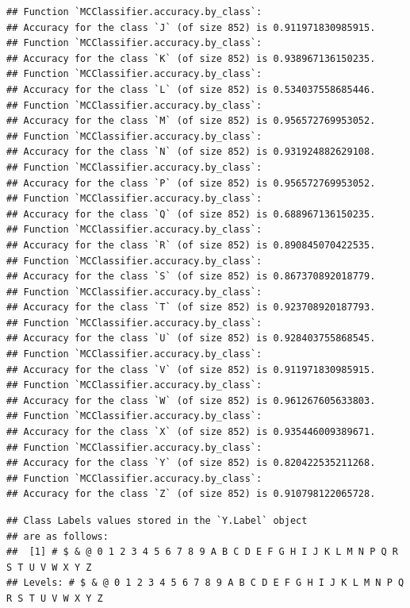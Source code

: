 \documentclass[
]{report}
\begin{document}
\begin{verbatim}
## Function `MCClassifier.accuracy.by_class`:
## Accuracy for the class `J` (of size 852) is 0.911971830985915.
## Function `MCClassifier.accuracy.by_class`:
## Accuracy for the class `K` (of size 852) is 0.938967136150235.
## Function `MCClassifier.accuracy.by_class`:
## Accuracy for the class `L` (of size 852) is 0.534037558685446.
## Function `MCClassifier.accuracy.by_class`:
## Accuracy for the class `M` (of size 852) is 0.956572769953052.
## Function `MCClassifier.accuracy.by_class`:
## Accuracy for the class `N` (of size 852) is 0.931924882629108.
## Function `MCClassifier.accuracy.by_class`:
## Accuracy for the class `P` (of size 852) is 0.956572769953052.
## Function `MCClassifier.accuracy.by_class`:
## Accuracy for the class `Q` (of size 852) is 0.688967136150235.
## Function `MCClassifier.accuracy.by_class`:
## Accuracy for the class `R` (of size 852) is 0.890845070422535.
## Function `MCClassifier.accuracy.by_class`:
## Accuracy for the class `S` (of size 852) is 0.867370892018779.
## Function `MCClassifier.accuracy.by_class`:
## Accuracy for the class `T` (of size 852) is 0.923708920187793.
## Function `MCClassifier.accuracy.by_class`:
## Accuracy for the class `U` (of size 852) is 0.928403755868545.
## Function `MCClassifier.accuracy.by_class`:
## Accuracy for the class `V` (of size 852) is 0.911971830985915.
## Function `MCClassifier.accuracy.by_class`:
## Accuracy for the class `W` (of size 852) is 0.961267605633803.
## Function `MCClassifier.accuracy.by_class`:
## Accuracy for the class `X` (of size 852) is 0.935446009389671.
## Function `MCClassifier.accuracy.by_class`:
## Accuracy for the class `Y` (of size 852) is 0.820422535211268.
## Function `MCClassifier.accuracy.by_class`:
## Accuracy for the class `Z` (of size 852) is 0.910798122065728.
\end{verbatim}

\normalsize

\newpage

\footnotesize

\begin{verbatim}
## Class Labels values stored in the `Y.Label` object
## are as follows:
##  [1] # $ & @ 0 1 2 3 4 5 6 7 8 9 A B C D E F G H I J K L M N P Q R S T U V W X Y Z
## Levels: # $ & @ 0 1 2 3 4 5 6 7 8 9 A B C D E F G H I J K L M N P Q R S T U V W X Y Z
\end{verbatim}

\normalsize

\footnotesize
\end{document}
